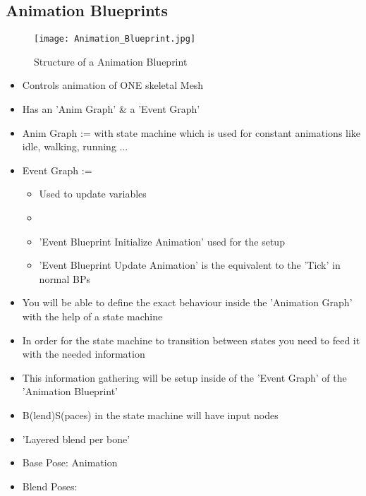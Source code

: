         \subsection{Animation Blueprints}
            \begin{figure}[ht]
                \texttt{[image: Animation\_Blueprint.jpg]}
                \caption{Structure of a Animation Blueprint}
            \end{figure}
            \begin{itemize}
                \item Controls animation of ONE skeletal Mesh
                \item Has an 'Anim Graph' \& a 'Event Graph'
                \item Anim Graph := with state machine which is used for constant animations like idle, walking, running ...
                \item Event Graph := 
                \begin{itemize}
                    \item Used to update variables
                    \item 
                    \item 'Event Blueprint Initialize Animation' used for the setup
                    \item 'Event Blueprint Update Animation' is the equivalent to the 'Tick' in normal BPs
                \end{itemize}
                \item You will be able to define the exact behaviour inside the 'Animation Graph' with the help of a state machine
                \item In order for the state machine to transition between states you need to feed it with the needed information
                \item This information gathering will be setup inside of the 'Event Graph' of the 'Animation Blueprint'
            \end{itemize}

            \begin{itemize}
                \item B(lend)S(paces) in the state machine will have input nodes
                \item 'Layered blend per bone'
                \item Base Pose: Animation 
                \item Blend Poses: 
            \end{itemize}
    
